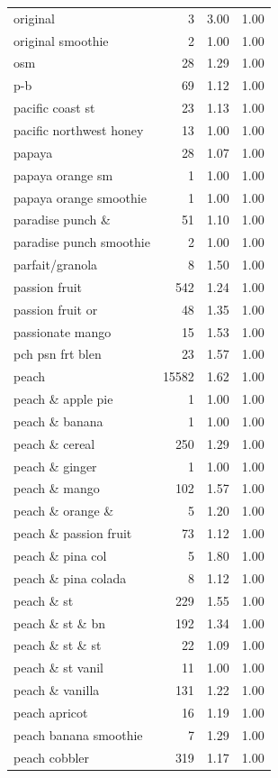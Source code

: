 \begin{table}
\begin{tabular}{lrrr}
original & 3 & 3.00 & 1.00 \\
original smoothie & 2 & 1.00 & 1.00 \\
osm & 28 & 1.29 & 1.00 \\
p-b & 69 & 1.12 & 1.00 \\
pacific coast st & 23 & 1.13 & 1.00 \\
pacific northwest honey & 13 & 1.00 & 1.00 \\
papaya & 28 & 1.07 & 1.00 \\
papaya orange sm & 1 & 1.00 & 1.00 \\
papaya orange smoothie & 1 & 1.00 & 1.00 \\
paradise punch \& & 51 & 1.10 & 1.00 \\
paradise punch smoothie & 2 & 1.00 & 1.00 \\
parfait/granola & 8 & 1.50 & 1.00 \\
passion fruit & 542 & 1.24 & 1.00 \\
passion fruit or & 48 & 1.35 & 1.00 \\
passionate mango & 15 & 1.53 & 1.00 \\
pch psn frt blen & 23 & 1.57 & 1.00 \\
peach & 15582 & 1.62 & 1.00 \\
peach \& apple pie & 1 & 1.00 & 1.00 \\
peach \& banana & 1 & 1.00 & 1.00 \\
peach \& cereal & 250 & 1.29 & 1.00 \\
peach \& ginger & 1 & 1.00 & 1.00 \\
peach \& mango & 102 & 1.57 & 1.00 \\
peach \& orange \& & 5 & 1.20 & 1.00 \\
peach \& passion fruit & 73 & 1.12 & 1.00 \\
peach \& pina col & 5 & 1.80 & 1.00 \\
peach \& pina colada & 8 & 1.12 & 1.00 \\
peach \& st & 229 & 1.55 & 1.00 \\
peach \& st \& bn & 192 & 1.34 & 1.00 \\
peach \& st \& st & 22 & 1.09 & 1.00 \\
peach \& st vanil & 11 & 1.00 & 1.00 \\
peach \& vanilla & 131 & 1.22 & 1.00 \\
peach apricot & 16 & 1.19 & 1.00 \\
peach banana smoothie & 7 & 1.29 & 1.00 \\
peach cobbler & 319 & 1.17 & 1.00 \\

\end{tabular}
\end{table}
